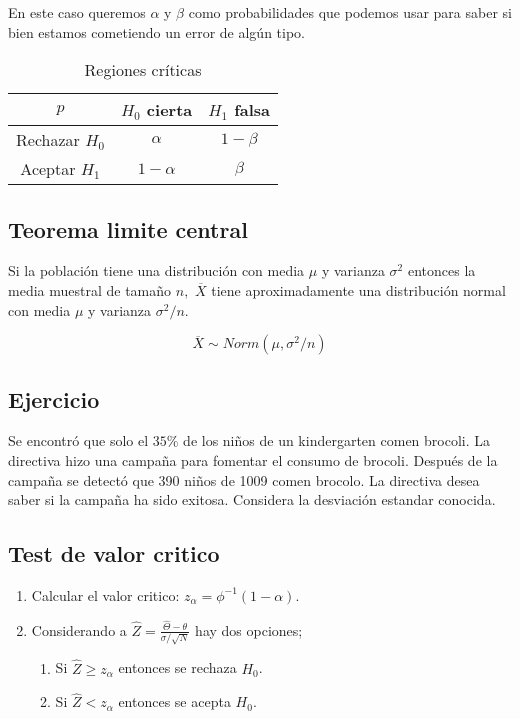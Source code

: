 \documentclass{assignment}
\begin{document}
En este caso queremos $\alpha$ y $\beta$ como probabilidades que podemos usar para saber si bien estamos cometiendo un error de algún tipo.

\begin{table}[h]
    \centering
    \begin{tabular}{|c|c|c|}
    \hline
    $p$  & $H_0$ cierta & $H_1$ falsa   \\
    \hline
    Rechazar $H_0$  & $\alpha$ &  $1-\beta$   \\
    \hline
    Aceptar $H_1$ & $1-\alpha$ & $\beta$  \\
    \hline
    \end{tabular}
    \caption{Regiones críticas}
\end{table}

\newpage

\subsection*{Teorema limite central}
 Si la población tiene una distribución con media $\mu$ y varianza $\sigma^2$ entonces la media muestral de tamaño $n,$ $\overline{X}$ tiene aproximadamente una distribución normal con media $\mu$ y varianza $\sigma^2/n$. 
 
\[
\overline{X} \sim Norm(\mu,\sigma^2/n)
\] 


\subsection*{Ejercicio}
Se encontró que solo el $35\%$ de los niños de un kindergarten comen brocoli. La directiva hizo una campaña para fomentar el consumo de brocoli. Después de la campaña se detectó que 390 niños de 1009 comen brocolo. La directiva desea saber si la campaña ha sido exitosa. Considera la desviación estandar conocida. 



\subsection*{Test de valor critico}

\begin{enumerate}
	\item Calcular el valor critico: $z_\alpha=\phi^{-1}(1-\alpha)$.
	\item Considerando a $\hat{Z}=\frac{\hat{\Theta} - \theta}{\sigma / \sqrt{N}}$ hay dos opciones;
		\begin{enumerate}
			\item 
Si $\hat{Z} \geq z_\alpha$ entonces se rechaza $H_0$.
			\item Si $\hat{Z} < z_\alpha$ entonces se acepta $H_0$.
		\end{enumerate}
\end{enumerate}
\end{document}
